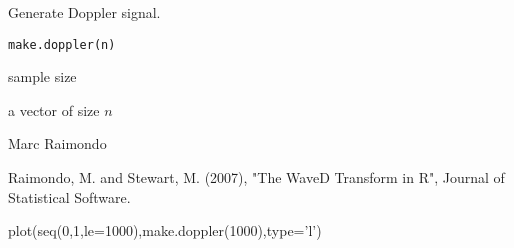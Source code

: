 \documentclass{article}
\begin{document}
\begin{Description}\relax
Generate Doppler signal.
\end{Description}
\begin{Usage}
\begin{verbatim}
make.doppler(n)
\end{verbatim}
\end{Usage}
\begin{Arguments}
\begin{ldescription}
\item[\code{n}] sample size
\end{ldescription}
\end{Arguments}
\begin{Value}
a vector of size $n$
\end{Value}
\begin{Author}\relax
Marc Raimondo
\end{Author}
\begin{References}\relax
Raimondo, M. and Stewart, M. (2007),
"The WaveD Transform in R", Journal of Statistical Software.
\end{References}
\begin{SeeAlso}\relax
{}
\end{SeeAlso}
\begin{Examples}
\begin{ExampleCode}
plot(seq(0,1,le=1000),make.doppler(1000),type='l')
\end{ExampleCode}
\end{Examples}
\end{document}
